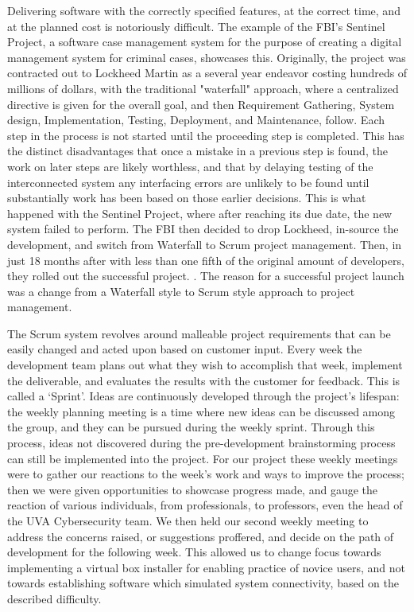 \documentclass[openright]{report}
\begin{document}
\par Delivering software with the correctly specified features, at the correct time, and at the planned cost is notoriously difficult. The example of the FBI’s Sentinel Project, a software case management system for the purpose of creating a digital management system for criminal cases, showcases this. Originally, the project was contracted out to Lockheed Martin as a several year endeavor costing hundreds of millions of dollars, with the traditional "waterfall" approach, where a centralized directive is given for the overall goal, and then Requirement Gathering, System design, Implementation, Testing, Deployment, and Maintenance, follow. Each step in the process is not started until the proceeding step is completed. This has the distinct disadvantages that once a mistake in a previous step is found, the work on later steps are likely worthless, and that by delaying testing of the interconnected system any interfacing errors are unlikely to be found until substantially work has been based on those earlier decisions{\cite{scrumFBI}}.  This is what happened with the Sentinel Project, where after reaching its due date, the new system failed to perform. The FBI then decided to drop Lockheed, in-source the development, and switch from Waterfall to Scrum project management. Then, in just 18 months after with less than one fifth of the original amount of developers, they rolled out the successful project. {\cite{scrumFBI}}. The reason for a successful project launch was a change from a Waterfall style to Scrum style approach to project management.

\par The Scrum system revolves around malleable project requirements that can be easily changed and acted upon based on customer input. Every week the development team plans out what they wish to accomplish that week, implement the deliverable, and evaluates the results with the customer for feedback. This is called a ‘Sprint’. Ideas are continuously developed through the project’s lifespan: the weekly planning meeting is a time where new ideas can be discussed among the group, and they can be pursued during the weekly sprint. Through this process, ideas not discovered during the pre-development brainstorming process can still be implemented into the project. For our project these weekly meetings were to gather our reactions to the week's work and ways to improve the process; then we were given opportunities to showcase progress made, and gauge the reaction of various individuals, from professionals, to professors, even the head of the UVA Cybersecurity team. We then held our second weekly meeting to address the concerns raised, or suggestions proffered, and decide on the path of development for the following week. This allowed us to change focus towards implementing a virtual box installer for enabling practice of novice users, and not towards establishing software which simulated system connectivity, based on the described difficulty. 
\end{document}
